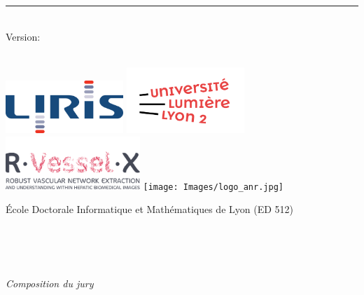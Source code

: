 %
\begin{titlepage}
	\flushright
	\hfill
	\vfill
	{\LARGE\thesisTitle \par}
	\rule[5pt]{\textwidth}{.4pt} \par
	{\Large\thesisName}
	\vfill
	\textit{\large\thesisDate} \\
	Version: \thesisVersion
\end{titlepage}


\begin{titlepage}
	\tgherosfont
	\centering

	{\Large \thesisUniversity} \\[4mm]
	\includegraphics[height=2cm]{Images/logo_liris.png}
	\includegraphics[height=2.5cm]{Images/logo_lyon2.png} 
	\\ 
	\includegraphics[height=2cm]{Images/logo_rvx.png}   
	\texttt{[image: Images/logo\_anr.jpg]}

	École Doctorale Informatique et Mathématiques de Lyon (ED 512)

	\vfill
	{\large \thesisSubject} \\[5mm]
	{\LARGE \color{ctcolortitle}\textbf{\thesisTitle} \\[10mm]}
	{\Large \thesisName} \\

	\vfill
	\begin{minipage}[t]{.27\textwidth}
		\raggedleft
		\textit{Composition du jury}
	\end{minipage}


\end{titlepage}
